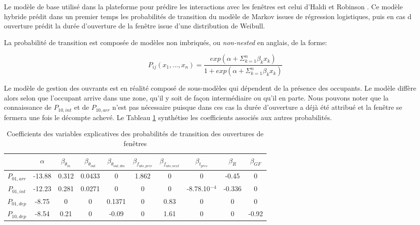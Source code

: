  Le modèle de base utilisé dans la plateforme pour prédire les interactions avec les fenêtres est celui d'Haldi et Robinson \cite{Haldi-09}. Ce modèle hybride prédit dans un premier temps les probabilités de transition du modèle de Markov issues de régression logistiques, puis en cas d ouverture prédit la durée d'ouverture de la fenêtre issue d'une distribution de Weibull.

La probabilité de transition est composée de modèles non imbriqués, ou \textit{non-nested} en anglais, de la forme:

\begin{equation}
P_{ij}(x_{1},...,x_{n})=\frac{exp(\alpha + \Sigma^{n}_{k=1}\beta_{k}x_{k})}{1+exp(\alpha + \Sigma^{n}_{k=1}\beta_{k}x_{k})}
\label{Pij}
\end{equation}

Le modèle de gestion des ouvrants est en réalité composé de sous-modèles qui dépendent de la présence des occupants. Le modèle diffère alors selon que l'occupant arrive dans une zone, qu'il y soit de façon intermédiaire ou qu'il en parte. Nous pouvons noter que la connaissance de $P_{10,int}$ et de $P_{10,arr}$ n'est pas nécessaire puisque dans ces cas la durée d'ouverture a déjà été attribué et la fenêtre se fermera une fois le décompte achevé. Le Tableau \ref{coefWindows} synthétise les coefficients associés aux autres probabilités.

\begin{table} [H]
\begin{tabular}{|c||c|c|c|c|c|c|c|c|c|}
\hline 
 & $\alpha$ & $\beta_{\theta_{in}}$ & $\beta_{\theta_{out}}$ & $\beta_{\theta_{out,dm}}$ & $\beta_{f_{abs,prev}}$ & $\beta_{f_{abs,next}}$ &  $\beta_{t_{pres}}$ & $\beta_{R}$ & $\beta_{GF}$  \\ 
\hline 
\hline
$P_{01,arr}$ & -13.88 & 0.312 & 0.0433 & 0 & 1.862 & 0 & 0 & -0.45 & 0 \\ 
\hline 
$P_{01,int}$ & -12.23 & 0.281 & 0.0271 & 0 & 0 & 0 & -8.78.10$^{-4}$ & -0.336 & 0 \\ 
\hline 
$P_{01,dep}$ & -8.75 & 0 & 0 & 0.1371 & 0 & 0.83 & 0 & 0 & 0 \\ 
\hline 
$P_{10,dep}$ & -8.54 & 0.21 & 0 & -0.09 & 0 & 1.61 & 0 & 0 & -0.92 \\ 
\hline 
\end{tabular} 
\label{coefWindows}
\caption{Coefficients des variables explicatives des probabilités de transition des ouvertures de fenêtres}
\end{table}

